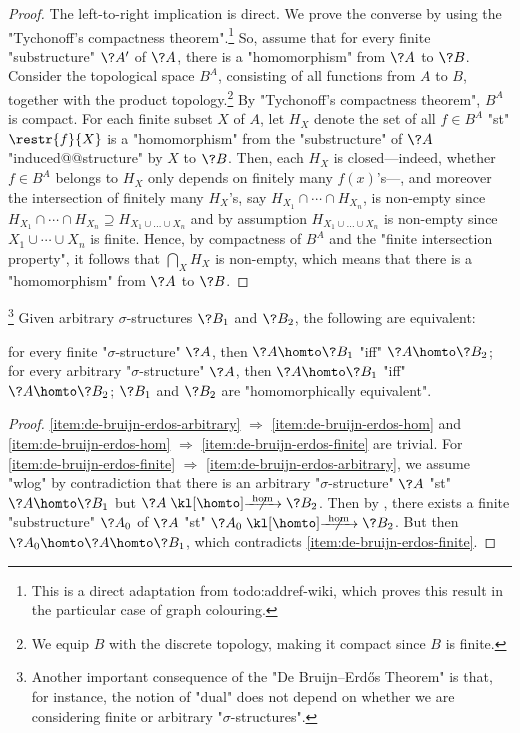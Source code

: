 \begin{proof}
	The left-to-right implication is direct.
	We prove the converse by using the "Tychonoff's compactness theorem".\footnote{This is a direct adaptation from todo:addref-wiki, which proves this result in the particular case of graph colouring.}
	So, assume that for every finite "substructure" $\?A'$ of $\?A$,
	there is a "homomorphism" from $\?A$ to $\?B$. 
	Consider the topological space $B^A$, consisting of all functions from $A$ to $B$,
	together with the product topology.\footnote{We equip $B$ with the discrete topology,
	making it compact since $B$ is finite.} By "Tychonoff's compactness theorem",
	$B^A$ is compact. For each finite subset $X$ of $A$, let
	$H_X$ denote the set of all $f \in B^A$ "st" $\restr{f}{X}$ is a "homomorphism"
	from the "substructure" of $\?A$ "induced@@structure" by $X$ to $\?B$.
	Then, each $H_X$ is closed---indeed, whether $f\in B^A$ belongs to $H_X$ only depends
	on finitely many $f(x)$'s---, and moreover the intersection of finitely many
	$H_X$'s, say $H_{X_1} \cap \cdots \cap H_{X_n}$, is non-empty since
	$H_{X_1} \cap \cdots \cap H_{X_n} \supseteq H_{X_1\cup \hdots \cup X_n}$
	and by assumption $H_{X_1\cup \hdots \cup X_n}$ is non-empty since $X_1 \cup \cdots \cup X_n$ is finite. Hence, by compactness of $B^A$ and the "finite intersection property", it follows
	that $\bigcap_X H_X$ is non-empty, which means that there is a "homomorphism" from $\?A$ to $\?B$.
\end{proof}

\begin{corollary}
	\!\footnote{Another important consequence of the "De Bruijn–Erdős Theorem" is that,
	for instance, the notion of "dual" does not depend on whether we are considering finite or
	arbitrary "$\sigma$-structures".}
	\AP\label{coro:de-bruijn-erdos}
	Given arbitrary $\sigma$-structures $\?B_1$ and $\?B_2$, the following are equivalent:
	\begin{enumerate}
		\itemAP\label{item:de-bruijn-erdos-finite} for every finite "$\sigma$-structure" $\?A$, then $\?A \homto \?B_1$
		"iff" $\?A \homto \?B_2$;
		\itemAP\label{item:de-bruijn-erdos-arbitrary} for every arbitrary "$\sigma$-structure" $\?A$, then $\?A \homto \?B_1$
			"iff" $\?A \homto \?B_2$;
		\itemAP\label{item:de-bruijn-erdos-hom} $\?B_1$ and $\?B_2$ are "homomorphically equivalent".
	\end{enumerate}
\end{corollary}
\begin{proof}
	\eqref{item:de-bruijn-erdos-arbitrary} $\Rightarrow$ \eqref{item:de-bruijn-erdos-hom}
	and \eqref{item:de-bruijn-erdos-hom} $\Rightarrow$ \eqref{item:de-bruijn-erdos-finite}
	are trivial.
	For \eqref{item:de-bruijn-erdos-finite} $\Rightarrow$ \eqref{item:de-bruijn-erdos-arbitrary},
	we assume "wlog" by contradiction that there is an arbitrary "$\sigma$-structure" $\?A$ "st" $\?A \homto \?B_1$ but $\?A \nothomto \?B_2$. Then by ,
	there exists a finite "substructure" $\?A_0$ of $\?A$ "st" $\?A_0 \nothomto \?B_2$.
	But then $\?A_0 \homto \?A \homto \?B_1$, which contradicts \eqref{item:de-bruijn-erdos-finite}.
\end{proof}